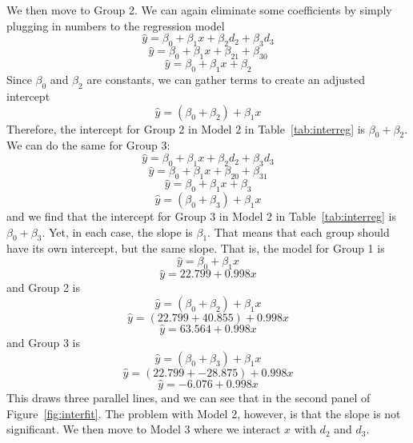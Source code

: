 We then move to Group 2. We can again eliminate some coefficients by simply plugging in numbers to the regression model
\[
\hat{y}=\beta_0+\beta_1x+\beta_2d_{2}+\beta_3d_{3}
\]
\[
\hat{y}=\beta_0+\beta_1x+\beta_21+\beta_30
\]
\[
\hat{y}=\beta_0+\beta_1x+\beta_2
\]
Since $\beta_0$ and $\beta_2$ are constants, we can gather terms to create an adjusted intercept
\[
\hat{y}=\left(\beta_0+\beta_2\right)+\beta_1x
\]
Therefore, the intercept for Group 2 in Model 2 in Table~\ref{tab:interreg} is $\beta_0+\beta_2$. We can do the same for Group 3:
\[
\hat{y}=\beta_0+\beta_1x+\beta_2d_{2}+\beta_3d_{3}
\]
\[
\hat{y}=\beta_0+\beta_1x+\beta_20+\beta_31
\]
\[
\hat{y}=\beta_0+\beta_1x+\beta_3
\]
\[
\hat{y}=\left(\beta_0+\beta_3\right)+\beta_1x
\]
and we find that the intercept for Group 3 in Model 2 in Table~\ref{tab:interreg} is $\beta_0+\beta_3$. Yet, in each case, the slope is $\beta_1$. That means that each group should have its own intercept, but the same slope. That is, the model for Group 1 is
\[
\hat{y}=\beta_0+\beta_1x
\]
\[
\hat{y}=22.799+0.998x
\]
and Group 2 is
\[
\hat{y}=\left(\beta_0+\beta_2\right)+\beta_1x
\]
\[
\hat{y}=\left(22.799+40.855\right)+0.998x
\]
\[
\hat{y}=63.564+0.998x
\]
and Group 3 is
\[
\hat{y}=\left(\beta_0+\beta_3\right)+\beta_1x
\]
\[
\hat{y}=\left(22.799+-28.875\right)+0.998x
\]
\[
\hat{y}=-6.076+0.998x
\]
This draws three parallel lines, and we can see that in the second panel of Figure~\ref{fig:interfit}. The problem with Model 2, however, is that the slope is not significant. We then move to Model 3 where we interact $x$ with $d_2$ and $d_3$.

